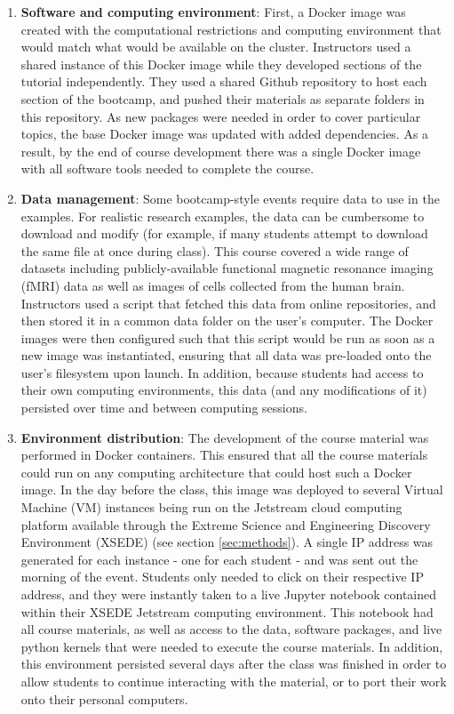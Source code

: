 \begin{enumerate}

\item {\bf Software and computing environment}: First, a Docker image
\cite{merkel2014docker} was created with the computational restrictions and
computing environment that would match what would be available on the cluster.
Instructors used a shared instance of this Docker image while they developed
sections of the tutorial independently. They used a shared Github repository to
host each section of the bootcamp, and pushed their materials as separate
folders in this repository. As new packages were needed in order to cover
particular topics, the base Docker image was updated with added dependencies. As
a result, by the end of course development there was a single Docker image with
all software tools needed to complete the course.

\item {\bf Data management}: Some bootcamp-style events require data to use in
the examples. For realistic research examples, the data can be cumbersome to
download and modify (for example, if many students attempt to download the
same file at once during class). This course covered a wide range of datasets
including publicly-available functional magnetic resonance imaging (fMRI) data
as well as images of cells collected from the human brain. Instructors used a
script that fetched this data from online repositories, and then stored it in
a common data folder on the user's computer. The Docker images were then
configured such that this script would be run as soon as a new image was
instantiated, ensuring that all data was pre-loaded onto the user's
filesystem upon launch. In addition, because students had access to their
own computing environments, this data (and any modifications of it) persisted
over time and between computing sessions.

\item {\bf Environment distribution}: The development of the course material was
performed in Docker containers. This ensured that all the course materials could run
on any computing architecture that could host such a Docker image. In the day
before the class, this image was deployed to several Virtual Machine (VM)
instances being run on the Jetstream cloud computing platform
\cite{Stewart2014Jestream} available through the Extreme Science and Engineering
Discovery Environment (XSEDE) \cite{Towns2014XSEDE}  (see section
\ref{sec:methods}). A single IP address was generated for each instance - one
for each student - and was sent out the morning of the event. Students only
needed to click on their respective IP address, and they were instantly taken
to a live Jupyter notebook contained within their XSEDE Jetstream computing
environment. This notebook had all course materials, as well as access to the
data, software packages, and live python kernels that were needed to execute the
course materials. In addition, this environment persisted several days after the
class was finished in order to allow students to continue interacting with the
material, or to port their work onto their personal computers.


\end{enumerate}

